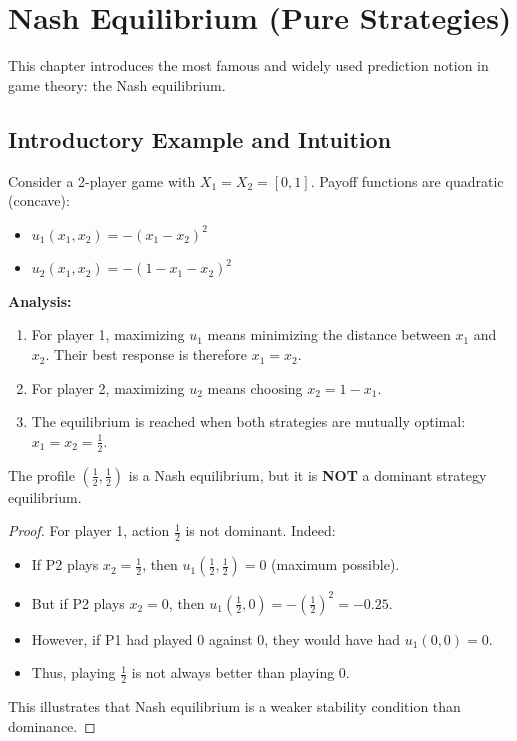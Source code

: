 \chapter{Nash Equilibrium (Pure Strategies)}

This chapter introduces the most famous and widely used prediction notion in game theory: the Nash equilibrium.

\section{Introductory Example and Intuition}
Consider a 2-player game with $X_1 = X_2 = [0,1]$. Payoff functions are quadratic (concave):
\begin{itemize}
    \item $u_1(x_1, x_2) = -(x_1 - x_2)^2$
    \item $u_2(x_1, x_2) = -(1 - x_1 - x_2)^2$
\end{itemize}

\textbf{Analysis:}
\begin{enumerate}
    \item For player 1, maximizing $u_1$ means minimizing the distance between $x_1$ and $x_2$. Their best response is therefore $x_1 = x_2$.
    \item For player 2, maximizing $u_2$ means choosing $x_2 = 1 - x_1$.
    \item The equilibrium is reached when both strategies are mutually optimal: $x_1 = x_2 = \frac{1}{2}$.
\end{enumerate}

\begin{remarque}
The profile $(\frac{1}{2}, \frac{1}{2})$ is a Nash equilibrium, but it is \textbf{NOT} a dominant strategy equilibrium.
\begin{proof}
For player 1, action $\frac{1}{2}$ is not dominant. Indeed:
\begin{itemize}
    \item If P2 plays $x_2 = \frac{1}{2}$, then $u_1(\frac{1}{2}, \frac{1}{2}) = 0$ (maximum possible).
    \item But if P2 plays $x_2 = 0$, then $u_1(\frac{1}{2}, 0) = -(\frac{1}{2})^2 = -0.25$.
    \item However, if P1 had played $0$ against $0$, they would have had $u_1(0,0) = 0$.
    \item Thus, playing $\frac{1}{2}$ is not always better than playing $0$.
\end{itemize}
This illustrates that Nash equilibrium is a weaker stability condition than dominance.
\end{proof}
\end{remarque}

